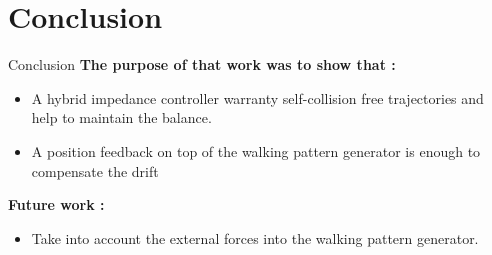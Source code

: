 \section{Conclusion}

\begin{frame}{Conclusion}
\vspace{0.5cm}
\textbf{\color{blue} The purpose of that work was to show that :}
\begin{itemize}
  \item A hybrid impedance controller warranty self-collision free trajectories and help to maintain the balance.
  \item A position feedback on top of the walking pattern generator is enough to compensate the drift
\end{itemize}

\textbf{\color{blue} Future work :}
\begin{itemize}
  \item Take into account the external forces into the walking pattern generator.
\end{itemize}

\end{frame}
